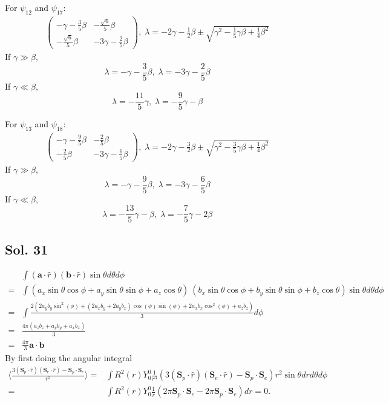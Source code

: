 For $\psi_{12}$ and $\psi_{17}:$
\begin{align*}
    \begin{pmatrix}
        -\gamma - \frac{3}{5}\beta & -\frac{\sqrt{6}}{5}\beta\\
        -\frac{\sqrt{6}}{5}\beta & -3\gamma - \frac{2}{5}\beta
    \end{pmatrix},
    \; \lambda = -2\gamma - \frac{1}{2}\beta \pm \sqrt{\gamma^2 - \frac{1}{5}\gamma\beta + \frac{1}{4}\beta^2} 
\end{align*}
If $\gamma\gg\beta,$
$$
\lambda = -\gamma-\frac{3}{5}\beta,\; \lambda=-3\gamma-\frac{2}{5}\beta
$$
If $\gamma\ll\beta,$
$$
\lambda =-\frac{11}{5}\gamma,\; \lambda=-\frac{9}{5}\gamma-\beta
$$

For $\psi_{13}$ and $\psi_{18}:$
\begin{align*}
    \begin{pmatrix}
        -\gamma - \frac{9}{5}\beta & -\frac{2}{5}\beta\\
        -\frac{2}{5}\beta & -3\gamma - \frac{6}{5}\beta
    \end{pmatrix},
    \; \lambda = -2\gamma - \frac{3}{2}\beta \pm \sqrt{\gamma^2 - \frac{3}{5}\gamma\beta + \frac{1}{4}\beta^2} 
\end{align*}
If $\gamma\gg\beta,$
$$
\lambda = -\gamma-\frac{9}{5}\beta,\; \lambda=-3\gamma-\frac{6}{5}\beta
$$
If $\gamma\ll\beta,$
$$
\lambda =-\frac{13}{5}\gamma-\beta,\; \lambda=-\frac{7}{5}\gamma-2\beta
$$


\subsection*{Sol. 31}
\begin{align*}
    &\int (\bm a\cdot \hat r)(\bm b\cdot \hat r)\sin\theta d\theta d\phi \\
    =& \int(a_x\sin\theta \cos\phi + a_y\sin\theta \sin\phi + a_z\cos\theta )\
    (b_x\sin\theta \cos\phi + b_y\sin\theta \sin\phi + b_z\cos\theta )\sin\theta d\theta d\phi\\
    =&\int \frac{2 \left(2a_{y} b_{y} \sin^{2}\left({\phi}\right) + \left(2a_{x} b_{y} + 2a_{y} b_{x}\right) \cos\left({\phi}\right) \sin\left({\phi}\right) + 2a_{x} b_{x} \cos^{2}\left({\phi}\right) + a_{z} b_{z}\right)}{3} d\phi\\
    =&\frac{4\pi \left(a_{z} b_{z} + a_{y} b_{y} + a_{x} b_{x}\right)}{3}\\
    =&\frac{4\pi}{3}\bm a\cdot \bm b
\end{align*}
By first doing the angular integral
\begin{align*}
\langle
\frac{3(\bm S_p\cdot \hat r)(\bm S_e\cdot \hat r) - \bm S_p\cdot \bm S_e}{r^3}
\rangle=&
    \int R^2(r)Y^0_0
    \frac{1}{r^3}(3(\bm S_p\cdot \hat r)(\bm S_e\cdot \hat r) - \bm S_p\cdot \bm S_e)r^2\sin\theta drd\theta d\phi \\
    =&\int R^2(r)Y^0_0
    \frac{1}{r}(2\pi \bm S_p\cdot \bm S_e - 2\pi \bm S_p\cdot \bm S_e)dr = 0.
\end{align*}


